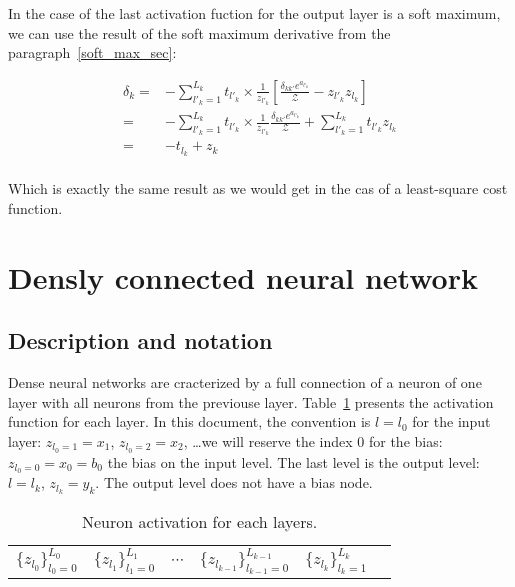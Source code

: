 \documentclass[final, paper=letter,5p,times,twocolumn]{elsarticle}
\begin{document}
In the case of the last activation fuction for the output layer is a soft maximum, we can use the result of the soft maximum derivative from the paragraph~\ref{soft_max_sec}:

\begin{equation*}
  \begin{split}
    \delta_{k} = & - \sum_{l'_{k} = 1}^{L_{k}} t_{l'_{k}} \times \frac{1}{z_{l'_{k}}} \left \lbrack  \frac{\delta_{kk'} e^{a_{l'_{k}}}}{\mathcal{Z}} - z_{l'_{k}}z_{l_{k}} \right \rbrack \\
    = & - \sum_{l'_{k} = 1}^{L_{k}} t_{l'_{k}} \times \frac{1}{z_{l'_{k}}} \frac{\delta_{kk'} e^{a_{l'_{k}}}}{\mathcal{Z}} +  \sum_{l'_{k} = 1}^{L_{k}} t_{l'_{k}} z_{l_{k}} \\
    = & - t_{l_{k}} +  z_{k} \\
  \end{split}
\end{equation*}



Which is exactly the same result as we would get in the cas of a least-square cost function.


\section{Densly connected neural network}
\subsection{Description and notation}

Dense neural networks are cracterized by a full connection of a neuron of one layer with all neurons from the previouse layer. Table~\ref{Layers_activations} presents the activation function for each layer. In this document, the convention is $l = l_{0}$ for the input layer: $z_{l_{0} = 1} = x_{1}$, $z_{l_{0} = 2} = x_{2}$, \dots we will reserve the index 0 for the bias: $z_{l_{0} = 0} = x_{0} = b_{0}$ the bias on the input level. The last level is the output level: $l = l_{k}$, $z_{l_{k}} = y_{k}$. The output level does not have a bias node.

\begin{table}[]
\centering
\caption{Neuron activation for each layers.}
\label{Layers_activations}
\begin{tabular}{llllll}
 $\{ z_{l_{0}}\}_{l_{0} = 0}^{L_{0}}$&  $\{ z_{l_{1}}\}_{l_{1} = 0}^{L_{1}}$ &  $\cdots$ & $\{ z_{l_{k-1}}\}_{l_{k-1} = 0}^{L_{k-1}}$ &  $\{ z_{l_{k}}\}_{l_{k} = 1}^{L_{k}}$ &  \\ 
\end{tabular}
\end{table}
\end{document}
